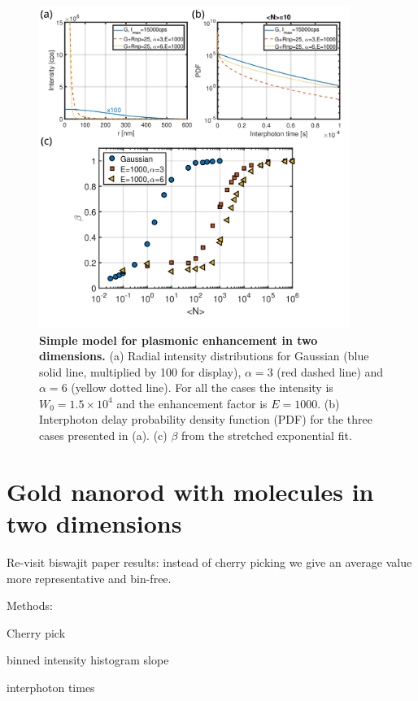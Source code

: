 \begin{figure}
\centering
\includegraphics[width=0.9\textwidth]{enhancement_model}%
\caption{\textbf{Simple model for plasmonic enhancement  in two dimensions.} (a) Radial intensity distributions for Gaussian (blue solid line, multiplied by 100 for display), $\alpha=3$ (red dashed line) and $\alpha=6$ (yellow dotted line). 
For all the cases the intensity is $W_0=1.5\times10^4$ and the enhancement factor is $E=1000$.
(b) Interphoton delay probability density function (PDF) for the three cases presented in (a).
(c) $\beta$ from the stretched exponential fit.
\label{fg:enahncement_model}}
\end{figure}



\section{Gold nanorod with molecules in two dimensions}


Re-visit biswajit paper results: instead of cherry picking we give an average value more representative and bin-free.

Methods:

Cherry pick

binned intensity histogram slope

interphoton times




